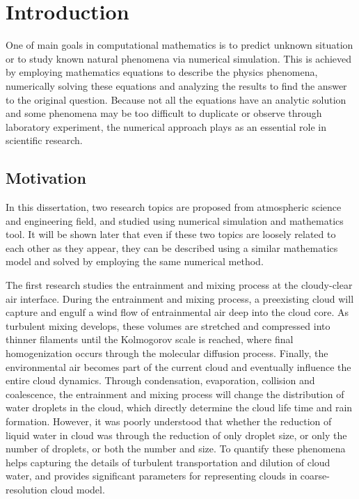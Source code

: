 \chapter{Introduction}
One of main goals in computational mathematics is to predict unknown situation or 
to study known natural phenomena via numerical simulation. This is achieved by employing 
mathematics equations to describe the physics phenomena, numerically solving these 
equations and analyzing the results to find the answer to the original question. 
Because not all the equations have an analytic solution and some phenomena may be too 
difficult to duplicate or observe through laboratory experiment, the numerical approach 
plays as an essential role in scientific research.

\section{Motivation}
In this dissertation, two research topics are proposed from atmospheric science and 
engineering field, and studied using numerical simulation and mathematics tool.
It will be shown later that even if these two topics are loosely related to each other 
as they appear, they can be described using a similar mathematics model and solved by
employing the same numerical method.

The first research studies the entrainment and mixing process at the cloudy-clear air interface. 
During the entrainment and mixing process, a preexisting cloud will capture and engulf a wind flow 
of entrainmental air deep into the cloud core. As turbulent mixing develops, these volumes are 
stretched and compressed into thinner filaments until the Kolmogorov scale is reached, where final 
homogenization occurs through the molecular diffusion process. Finally, the environmental air becomes 
part of the current cloud and eventually influence the entire cloud dynamics. Through condensation, 
evaporation, collision and coalescence, the entrainment and mixing process will change the distribution 
of water droplets in the cloud, which directly determine the cloud life time and rain formation. 
However, it was poorly understood that whether the reduction of liquid water in cloud 
was through the reduction of only droplet size, or only the number of droplets, or both the number 
and size. To quantify these phenomena helps capturing the details of turbulent transportation and 
dilution of cloud water, and provides significant parameters for representing clouds in coarse-resolution 
cloud model.

